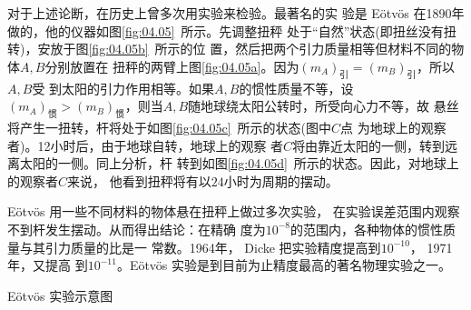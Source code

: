 对于上述论断，在历史上曾多次用实验来检验。最著名的实
验是 E\"otv\"os 在1890年做的，他的仪器如图\ref{fig:04.05}~所示。先调整扭秤
处于“自然”状态(即扭丝没有扭转)，安放于图\ref{fig:04.05b}~所示的位
置，然后把两个引力质量相等但材料不同的物体$ A, B $分别放置在
扭秤的两臂上\lhbrak 图\ref{fig:04.05a}\rhbrak 。因为$\left(m _ { A }\right) _ {\text{引}} = \left(m _ { B }\right) _ {\text{引}} $，所以$ A , B $受
到太阳的引力作用相等。如果$ A , B $的惯性质量不等，设$  \left(m _ { A }\right) _ {\text{惯}}  > \left(m _ { B }\right) _ {\text{惯}} $，则当$ A , B $随地球绕太阳公转时，所受向心力不等，故
悬丝将产生一扭转，杆将处于如图\ref{fig:04.05c}~所示的状态(图中$ C $点
为地球上的观察者)。12小时后，由于地球自转，地球上的观察
者$ C $将由靠近太阳的一侧，转到远离太阳的一侧。同上分析，杆
转到如图\ref{fig:04.05d}~所示的状态。因此，对地球上的观察者$ C $来说，
他看到扭秤将有以$ 24 $小时为周期的摆动。

E\"otv\"os 用一些不同材料的物体悬在扭秤上做过多次实验，
在实验误差范围内观察不到杆发生摆动。从而得出结论：在精确
度为$  1 0 ^ { - 8 }   $的范围内，各种物体的惯性质量与其引力质量的比是一
常数。1964年， Dicke 把实验精度提高到$  1 0 ^ { - 1 0 }  $， 1971 年，又提高
到$  1 0 ^ { - 1 1 }  $。E\"otv\"os 实验是到目前为止精度最高的著名物理实验之一。
\begin{figurex}[t]
  \centering
   \qquad
   \qquad
  \caption{E\"otv\"os 实验示意图}
  \label{fig:04.05}
\end{figurex}

